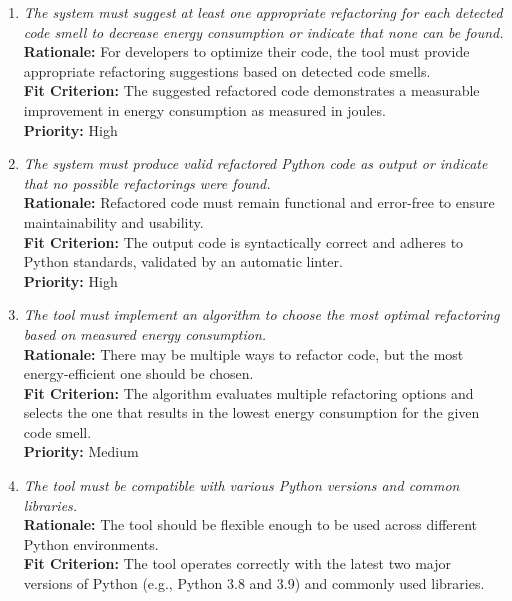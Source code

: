 \documentclass[12pt]{article}
\begin{document}
\begin{enumerate}[label=FR \arabic*., wide=0pt, leftmargin=*]
    {\bf Rationale:} Verifying that the refactored code preserves functionality requires the use of the original test suite.\\
    {\bf Fit Criterion:} Users can specify a path to their test suite that the tool recognizes and utilizes for testing the refactored code.\\
    {\bf Priority:} High
    \item \emph{The system must suggest at least one appropriate refactoring for each detected code smell to decrease energy consumption or indicate that none can be found.}\\[2mm]
    {\bf Rationale:} For developers to optimize their code, the tool must provide appropriate refactoring suggestions based on detected code smells.\\
    {\bf Fit Criterion:} The suggested refactored code demonstrates a measurable improvement in energy consumption as measured in joules.\\
    {\bf Priority:} High
    \item \emph{The system must produce valid refactored Python code as output or indicate that no possible refactorings were found.}\\[2mm]
    {\bf Rationale:} Refactored code must remain functional and error-free to ensure maintainability and usability.\\
    {\bf Fit Criterion:} The output code is syntactically correct and adheres to Python standards, validated by an automatic linter.\\
    {\bf Priority:} High
    \item \emph{The tool must implement an algorithm to choose the most optimal refactoring based on measured energy consumption.}\\[2mm]
    {\bf Rationale:} There may be multiple ways to refactor code, but the most energy-efficient one should be chosen.\\
    {\bf Fit Criterion:} The algorithm evaluates multiple refactoring options and selects the one that results in the lowest energy consumption for the given code smell.\\
    {\bf Priority:} Medium
    \item \emph{The tool must be compatible with various Python versions and common libraries.}\\[2mm]
    {\bf Rationale:} The tool should be flexible enough to be used across different Python environments.\\
    {\bf Fit Criterion:} The tool operates correctly with the latest two major versions of Python (e.g., Python 3.8 and 3.9) and commonly used libraries.\\

\end{enumerate}
\end{document}
